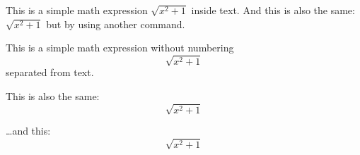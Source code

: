 \documentclass{article}
\begin{document}
	
	This is a simple math expression \(\sqrt{x^2+1}\) inside text. 
	And this is also the same: 
	\begin{math}
		\sqrt{x^2+1}
	\end{math}
	but by using another command.
	
	This is a simple math expression without numbering
	\[\sqrt{x^2+1}\] 
	separated from text.
	
	This is also the same:
	\begin{displaymath}
		\sqrt{x^2+1}
	\end{displaymath}
	
	\ldots and this:
	\begin{equation*}
		\sqrt{x^2+1}
	\end{equation*}
	
\end{document}
